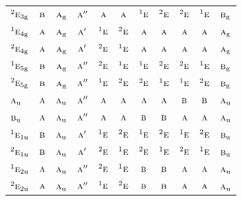 \documentclass[10pt,a4paper]{article}
\numberwithin{equation}{section}
\newcommand{\irr}[1]{\text{\normalfont\scshape #1}}
\newcommand{\conjpair}[1]{{}^{#1}}
\newcommand{\ptag}[1]{\mathrm{#1}}
\begin{document}
{\begin{longtable}{@{}lcccccccccc@{}}
$\conjpair{2}\irr{e}_{3\ptag{g}}$ & $\irr{b}$ & $\irr{a}_{\ptag{g}}$ & $\irr{a}''$ & $\irr{a}$ & $\irr{a}$ & $\conjpair{1}\irr{e}$ & $\conjpair{2}\irr{e}$ & $\conjpair{2}\irr{e}$ & $\conjpair{1}\irr{e}$ & $\irr{b}_{\ptag{g}}$\\
$\conjpair{1}\irr{e}_{4\ptag{g}}$ & $\irr{a}$ & $\irr{a}_{\ptag{g}}$ & $\irr{a}'$ & $\conjpair{1}\irr{e}$ & $\conjpair{2}\irr{e}$ & $\irr{a}$ & $\irr{a}$ & $\irr{a}$ & $\irr{a}$ & $\irr{a}_{\ptag{g}}$\\
$\conjpair{2}\irr{e}_{4\ptag{g}}$ & $\irr{a}$ & $\irr{a}_{\ptag{g}}$ & $\irr{a}'$ & $\conjpair{2}\irr{e}$ & $\conjpair{1}\irr{e}$ & $\irr{a}$ & $\irr{a}$ & $\irr{a}$ & $\irr{a}$ & $\irr{a}_{\ptag{g}}$\\
$\conjpair{1}\irr{e}_{5\ptag{g}}$ & $\irr{b}$ & $\irr{a}_{\ptag{g}}$ & $\irr{a}''$ & $\conjpair{2}\irr{e}$ & $\conjpair{1}\irr{e}$ & $\conjpair{1}\irr{e}$ & $\conjpair{2}\irr{e}$ & $\conjpair{2}\irr{e}$ & $\conjpair{1}\irr{e}$ & $\irr{b}_{\ptag{g}}$\\
$\conjpair{2}\irr{e}_{5\ptag{g}}$ & $\irr{b}$ & $\irr{a}_{\ptag{g}}$ & $\irr{a}''$ & $\conjpair{1}\irr{e}$ & $\conjpair{2}\irr{e}$ & $\conjpair{2}\irr{e}$ & $\conjpair{1}\irr{e}$ & $\conjpair{1}\irr{e}$ & $\conjpair{2}\irr{e}$ & $\irr{b}_{\ptag{g}}$\\
$\irr{a}_{\ptag{u}}$ & $\irr{a}$ & $\irr{a}_{\ptag{u}}$ & $\irr{a}''$ & $\irr{a}$ & $\irr{a}$ & $\irr{a}$ & $\irr{a}$ & $\irr{b}$ & $\irr{b}$ & $\irr{a}_{\ptag{u}}$\\
$\irr{b}_{\ptag{u}}$ & $\irr{a}$ & $\irr{a}_{\ptag{u}}$ & $\irr{a}''$ & $\irr{a}$ & $\irr{a}$ & $\irr{b}$ & $\irr{b}$ & $\irr{a}$ & $\irr{a}$ & $\irr{a}_{\ptag{u}}$\\
$\conjpair{1}\irr{e}_{1\ptag{u}}$ & $\irr{b}$ & $\irr{a}_{\ptag{u}}$ & $\irr{a}'$ & $\conjpair{1}\irr{e}$ & $\conjpair{2}\irr{e}$ & $\conjpair{1}\irr{e}$ & $\conjpair{2}\irr{e}$ & $\conjpair{1}\irr{e}$ & $\conjpair{2}\irr{e}$ & $\irr{b}_{\ptag{u}}$\\
$\conjpair{2}\irr{e}_{1\ptag{u}}$ & $\irr{b}$ & $\irr{a}_{\ptag{u}}$ & $\irr{a}'$ & $\conjpair{2}\irr{e}$ & $\conjpair{1}\irr{e}$ & $\conjpair{2}\irr{e}$ & $\conjpair{1}\irr{e}$ & $\conjpair{2}\irr{e}$ & $\conjpair{1}\irr{e}$ & $\irr{b}_{\ptag{u}}$\\
$\conjpair{1}\irr{e}_{2\ptag{u}}$ & $\irr{a}$ & $\irr{a}_{\ptag{u}}$ & $\irr{a}''$ & $\conjpair{2}\irr{e}$ & $\conjpair{1}\irr{e}$ & $\irr{b}$ & $\irr{b}$ & $\irr{a}$ & $\irr{a}$ & $\irr{a}_{\ptag{u}}$\\
$\conjpair{2}\irr{e}_{2\ptag{u}}$ & $\irr{a}$ & $\irr{a}_{\ptag{u}}$ & $\irr{a}''$ & $\conjpair{1}\irr{e}$ & $\conjpair{2}\irr{e}$ & $\irr{b}$ & $\irr{b}$ & $\irr{a}$ & $\irr{a}$ & $\irr{a}_{\ptag{u}}$\\

\end{longtable}}
\end{document}
